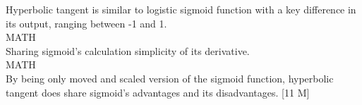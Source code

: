 
Hyperbolic tangent is similar to logistic sigmoid function with a key difference in its output, ranging between -1 and 1. \\

MATH\\

Sharing sigmoid's calculation simplicity of its derivative.\\

MATH\\

By being only moved and scaled version of the sigmoid function, hyperbolic tangent does share sigmoid's advantages and its disadvantages. [11 M]
